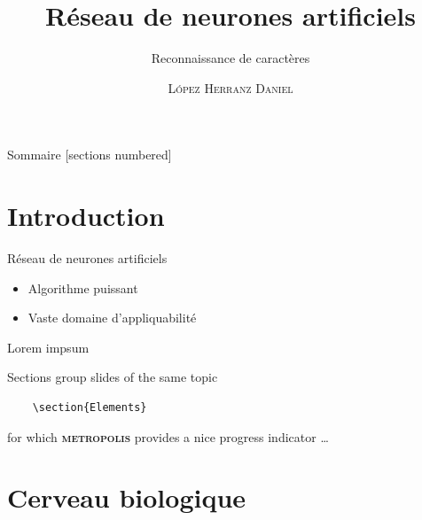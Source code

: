 \documentclass[10pt]{beamer}
\title{R\'eseau de neurones artificiels}
\subtitle{Reconnaissance de caract\`eres}
\date{}
\author{\textsc{L\'opez Herranz Daniel}}
\institute{Lyc\'ee Saint Louis}
\newcommand{\themename}{\textbf{\textsc{metropolis}}\xspace}
\begin{document}
\maketitle

\begin{frame}{Sommaire}
  [sections numbered]
  \tableofcontents[hideallsubsections]
\end{frame}

\section{Introduction}

\begin{frame}[fragile]{R\'eseau de neurones artificiels}
	\begin{itemize}
		\item Algorithme puissant
		\item Vaste domaine d'appliquabilit\'e
	\end{itemize}
\end{frame}

\begin{frame}[fragile]{Lorem impsum}
  
  Sections group slides of the same topic

  \begin{verbatim}    \section{Elements}\end{verbatim}

  for which \themename provides a nice progress indicator \ldots
\end{frame}

\section{Cerveau biologique}
\end{document}
